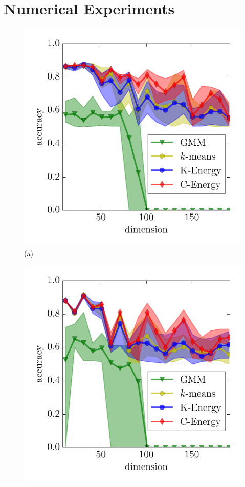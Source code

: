 \documentclass{article}
\begin{document}
\section{Numerical Experiments}


\begin{figure}
\begin{minipage}{0.33\textwidth}
\centering
\includegraphics[width=\textwidth]{gauss_means.pdf}\\[-.8em]
(a)
\end{minipage}
\begin{minipage}{0.33\textwidth}
\centering
\includegraphics[width=\textwidth]{gauss_covs.pdf}\\[-.8em]

\end{minipage}
\end{figure}
\end{document}
